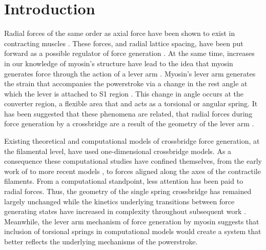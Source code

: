 \documentclass[]{article}
\begin{document}
\section{Introduction} %


Radial forces of the same order as axial force have been shown to exist in  contracting muscles \citep{Cecchi1990, Millman1998}. 
These forces, and radial lattice spacing, have been put forward as a possible regulator of force generation \citep{Fuchs2005}. 
At the same time, increases in our knowledge of myosin's structure have lead to the idea that myosin generates force through the action of a lever arm \citep{Rayment1993, Uyeda1996, Huxley2000}.
Myosin's lever arm generates the strain that accompanies the powerstroke via a change in the rest angle at which the lever is attached to S1 region \citep{Huxley2000, Houdusse:2001:p182}. 
This change in angle occurs at the converter region, a flexible area that and acts as a torsional or angular spring. 
It has been suggested that these phenomena are related, that radial forces during force generation by a crossbridge are a result of the geometry of the lever arm \citep{Schoenberg1980b}. 

Existing theoretical and computational models of crossbridge force generation, at the filamental level, have used one-dimensional crossbridge models. 
As a consequence these computational studies have confined themselves, from the early work of \citet{Huxley1957} to more recent models \citep{Daniel1998, Chase:2004:p204, Tanner2007}, to forces aligned along the axes of the contractile filaments.  
From a computational standpoint, less attention has been paid to radial forces. 
Thus, the geometry of the single spring crossbridge has remained largely unchanged while the kinetics underlying transitions between force generating states have increased in complexity throughout subsequent work \citep{Pate1989, Daniel1998, Tanner2007}.
Meanwhile, the lever arm mechanism of force generation by myosin suggests that inclusion of torsional springs in computational models would create a system that better reflects the underlying mechanisms of the powerstroke. 
\end{document}
